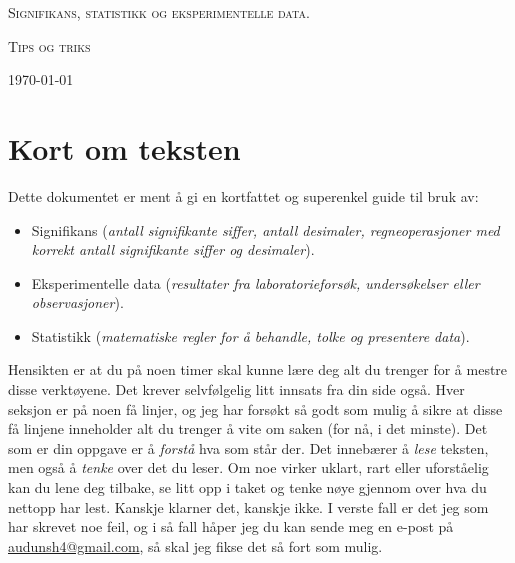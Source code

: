 \documentclass[a4paper,9pt]{article}
\begin{document}
\begin{centering}
	{\scshape\Large  Signifikans, statistikk og eksperimentelle data. \par}
	\vspace{1cm}
	{\scshape\Large Tips og triks    \par}
	\vspace{1.5cm}
	{\huge\bfseries \par}
	\vspace{2cm}

	{\large \today\par}
\end{centering}


\tableofcontents

\pagebreak

\section{Kort om teksten}

Dette dokumentet er ment å gi en kortfattet og superenkel guide til bruk av:

\begin{itemize}
\item Signifikans (\emph{antall signifikante siffer, antall desimaler, regneoperasjoner med korrekt antall signifikante siffer og desimaler}).
\item Eksperimentelle data (\emph{resultater fra laboratorieforsøk, undersøkelser eller observasjoner}).
\item Statistikk (\emph{matematiske regler for å behandle, tolke og presentere data}).
\end{itemize}

Hensikten er at du på noen timer skal kunne lære deg alt du trenger for å mestre disse verktøyene.  Det krever selvfølgelig litt innsats fra din side også. Hver seksjon er på noen få linjer, og jeg har forsøkt så godt som mulig å sikre at disse få linjene inneholder alt du trenger å vite om saken (for nå, i det minste). Det som er din oppgave er å \emph{forstå} hva som står der. Det innebærer å \emph{lese} teksten, men også å \emph{tenke} over det du leser. Om noe virker uklart, rart eller uforståelig kan du lene deg tilbake, se litt opp i taket og tenke nøye gjennom over hva du nettopp har lest. Kanskje klarner det, kanskje ikke. I verste fall er det jeg som har skrevet noe feil, og i så fall håper jeg du kan sende meg en e-post på \href{mailto:audunsh4@gmail.com}{audunsh4@gmail.com}, så skal jeg fikse det så fort som mulig.
\end{document}
